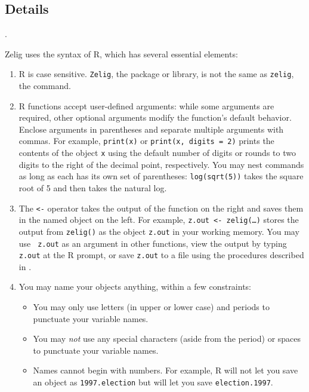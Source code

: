 \subsection{Details}\label{s:syntax}.

Zelig uses the syntax of R, which has several essential elements:
\begin{enumerate}
\item R is case sensitive.  \texttt{Zelig}, the package or library, is
  not the same as \texttt{zelig}, the command.
  
\item R functions accept user-defined arguments: while some arguments
  are required, other optional arguments modify the function's default
  behavior.  Enclose arguments in parentheses and separate multiple
  arguments with commas.  For example, {\tt print(x)} or {\tt print(x,
    digits = 2)} prints the contents of the object {\tt x} using the
  default number of digits or rounds to two digits to the right of the decimal
  point, respectively.  You may nest commands as long as each has its
  own set of parentheses: \texttt{log(sqrt(5))} takes the square root
  of 5 and then takes the natural log.
  
\item The {\tt <-} operator takes the output of the function on the
  right and saves them in the named object on the left.  For example,
  {\tt z.out <- zelig(\dots)} stores the output from {\tt zelig()} as
  the object {\tt z.out} in your working memory.  You may use {\tt
    z.out} as an argument in other functions, view the output by
  typing {\tt z.out} at the R prompt, or save {\tt z.out} to a file
  using the procedures described in .
  
\item You may name your objects anything, within a few constraints:
    \begin{itemize}
    \item You may only use letters (in upper or lower case) and
      periods to punctuate your variable names.
    \item You may \emph{not} use any special characters (aside from the
      period) or spaces to punctuate your variable names.
    \item Names cannot begin with numbers.  For example, R will not
      let you save an object as \texttt{1997.election} but will let
      you save \texttt{election.1997}.
    \end{itemize}
    

\end{enumerate}
